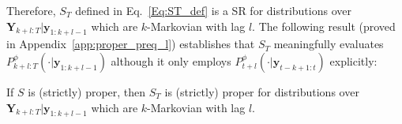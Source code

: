 \documentclass[twoside,11pt]{article}
\newcommand{\E}{\mathbb{E}}
\newcommand{\ddobs}{\mathbf{y}}
\newcommand{\Ddobs}{\mathbf{Y}}
\newcommand{\DdobsupT}{\mathbf{Y}_{1:T}}
\newcommand{\ddobsupT}{\mathbf{y}_{1:T}}
\DeclareMathOperator*{\argmin}{arg\,min}
\begin{document}
	Therefore, $ S_T $ defined in Eq.~\eqref{Eq:ST_def} is a SR for distributions over $ \Ddobs_{k+l:T}| \ddobs_{1:k+l-1}$ which are $ k $-Markovian with lag $ l $.
	The following result (proved in Appendix~\ref{app:proper_preq_l}) establishes that $ S_T $ meaningfully evaluates $ P^\phi_{k+l:T}(\cdot|\ddobs_{1:k+l-1}) $ although it only employs $P^\phi_{t+l}(\cdot|\ddobs_{t-k+1:t}) $ explicitly:
	
	\begin{theorem}\label{Th:main_proper}
		If $ S $ is (strictly) proper, then $ S_T $ is (strictly) proper for distributions over $ \Ddobs_{k+l:T}| \ddobs_{1:k+l-1} $
		which are $ k $-Markovian with lag $ l $.
	\end{theorem}
	
	
	
	
	
\end{document}
